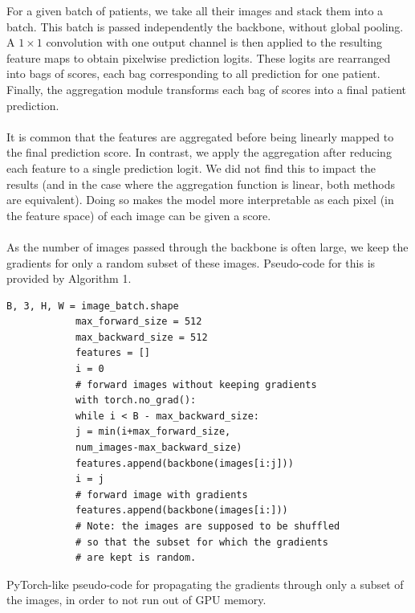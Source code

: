 \documentclass[final]{cvpr}
\begin{document}
	\noindent
	For a given batch of patients, we take all their images and stack them into a batch.
	This batch is passed independently the backbone, without global pooling. 
	A $1\times 1$ convolution with one output channel is then applied to the resulting feature maps to obtain pixelwise prediction logits.
	These logits are rearranged into bags of scores, each bag corresponding to all  prediction for one patient.
	Finally, the aggregation module transforms each bag of scores into a final patient prediction.\\
	\\
	It is common that the features are aggregated before being linearly mapped to the final prediction score.
	In contrast, we apply the aggregation after reducing each feature to a single prediction logit. We did not find this to impact the results (and in the case where the aggregation function is linear, both methods are equivalent). Doing so makes the model more interpretable as each pixel (in the feature space) of each image can be given a score. \\
	\\
	As the number of images passed through the backbone is often large, we keep the gradients for only a random subset of these images. Pseudo-code for this is provided by Algorithm 1.
	
	
	\begin{table}[h]
		\renewcommand\tablename{Pseudo-code}
		\begin{Verbatim}[fontsize=\footnotesize, samepage=true, frame=single]
			B, 3, H, W = image_batch.shape
			max_forward_size = 512
			max_backward_size = 512
			features = []
			i = 0
			# forward images without keeping gradients
			with torch.no_grad():
			while i < B - max_backward_size:
			j = min(i+max_forward_size,
			num_images-max_backward_size)
			features.append(backbone(images[i:j]))
			i = j
			# forward image with gradients
			features.append(backbone(images[i:]))
			# Note: the images are supposed to be shuffled
			# so that the subset for which the gradients
			# are kept is random.
		\end{Verbatim}
		\caption{PyTorch-like pseudo-code for propagating the gradients through only a subset of the images, in order to not run out of GPU memory.}
		\label{alg1}
	\end{table}
	
\end{document}

